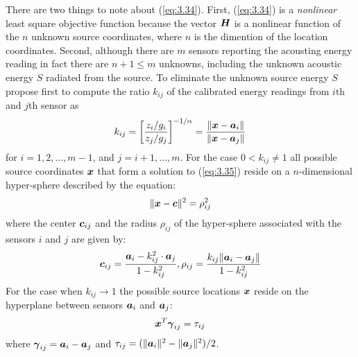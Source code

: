There are two things to note about (\ref{eq:3.34}). First, (\ref{eq:3.34}) is a \textit{nonlinear} least square objective function because the vector $\mbox{\boldmath$H$}$ is a nonlinear function of the $n$  unknown source coordinates, where $n$ is the dimention of the location coordinates. Second, although there are $m$ sensors reporting the acousting energy reading in fact there are $n + 1 \leq m$ unknowns, including the unknown acoustic energy $S$ radiated from the source. 
To eliminate the unknown source energy $S$ \cite{ShengHu}  propose first to compute the ratio $k_{ij}$ of the calibrated energy readings from $i$th and $j$th sensor as
\begin{equation} \label{eq:3.35}
k_{ij} = \left[ \frac{z_i / g_i}{z_j / g_j} \right]^{-1/\alpha} = \frac{\|\mbox{\boldmath$x$} - \mbox{\boldmath$a$}_i\|}{\|\mbox{\boldmath$x$} - \mbox{\boldmath$a$}_j\|}
\end{equation}
for $i = 1, 2, \ldots, m-1$, and $j = i+1, \ldots, m$. For the case $0 < k_{ij} \neq 1$ all possible source coordinates $\mbox{\boldmath$x$}$ that form a solution to (\ref{eq:3.35}) reside on a $n$-dimensional hyper-sphere described by the equation:
\begin{equation} \label{eq:3.36}
\| \mbox{\boldmath$x$} - \mbox{\boldmath$c$} \|^2 = \rho_{ij}^2
\end{equation}
where the center $\mbox{\boldmath$c$}_{ij}$ and the radius $\rho_{ij}$ of the hyper-sphere associated with the sensors $i$ and $j$  are given by:
\begin{equation} \label{eq:3.37}
\mbox{\boldmath$c$}_{ij} = \frac{\mbox{\boldmath$a$}_i - k_{ij}^2\cdot\mbox{\boldmath$a$}_j}{1-k_{ij}^2}, \rho_{ij} = \frac{k_{ij}\|\mbox{\boldmath$a$}_i - \mbox{\boldmath$a$}_j\|}{1-k_{ij}^2}
\end{equation}
For the case when $k_{ij} \rightarrow 1$ the possible source locations $\mbox{\boldmath$x$}$ reside on the hyperplane between sensors $\mbox{\boldmath$a$}_i$ and $\mbox{\boldmath$a$}_j$:
\begin{equation}
\nonumber
\mbox{\boldmath$x$}^T \mbox{\boldmath${\gamma}$}_{ij} = \tau_{ij}
\end{equation}
where $\mbox{\boldmath${\gamma}$}_{ij} = \mbox{\boldmath$a$}_i - \mbox{\boldmath$a$}_j$ and $\tau_{ij} = (\|\mbox{\boldmath$a$}_i\|^2 - \|\mbox{\boldmath$a$}_j\|^2) / 2$. 

